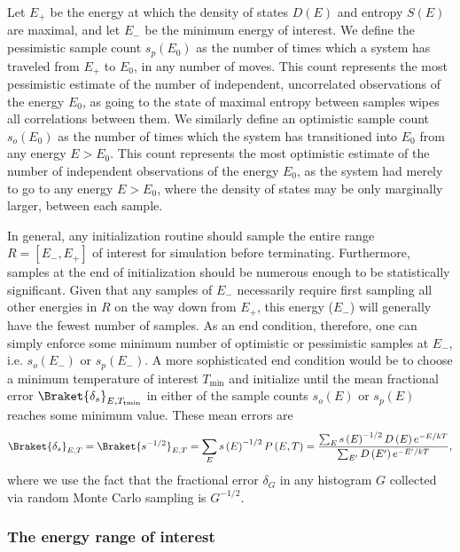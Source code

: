 \documentclass[11pt]{article}
\newcommand{\bk}{\Braket} %
\renewcommand{\t}{\text} %
\newcommand{\f}[2]{\dfrac{#1}{#2}} %
\newcommand{\p}[1]{\left(#1\right)} %
\renewcommand{\sp}[1]{\left[#1\right]} %
\begin{document}
Let $E_+$ be the energy at which the density of states $D\p{E}$ and
entropy $S\p{E}$ are maximal, and let $E_-$ be the minimum energy of
interest. We define the pessimistic sample count $s_p\p{E_0}$ as the
number of times which a system has traveled from $E_+$ to $E_0$, in
any number of moves. This count represents the most pessimistic
estimate of the number of independent, uncorrelated observations of
the energy $E_0$, as going to the state of maximal entropy between
samples wipes all correlations between them. We similarly define an
optimistic sample count $s_o\p{E_0}$ as the number of times which the
system has transitioned into $E_0$ from any energy $E>E_0$. This count
represents the most optimistic estimate of the number of independent
observations of the energy $E_0$, as the system had merely to go to
any energy $E>E_0$, where the density of states may be only marginally
larger, between each sample.

In general, any initialization routine should sample the entire range
$R=\sp{E_-,E_+}$ of interest for simulation before terminating.
Furthermore, samples at the end of initialization should be numerous
enough to be statistically significant. Given that any samples of
$E_-$ necessarily require first sampling all other energies in $R$ on
the way down from $E_+$, this energy ($E_-$) will generally have the
fewest number of samples. As an end condition, therefore, one can
simply enforce some minimum number of optimistic or pessimistic
samples at $E_-$, i.e. $s_o\p{E_-}$ or $s_p\p{E_-}$. A more
sophisticated end condition would be to choose a minimum temperature
of interest $T_{\t{min}}$ and initialize until the mean fractional
error $\bk{\delta_s}_{E,T_{\t{tmin}}}$ in either of the sample counts
$s_o\p{E}$ or $s_p\p{E}$ reaches some minimum value. These mean errors
are
\begin{align}
  \bk{\delta_s}_{E,T}=\bk{s^{-1/2}}_{E,T}=\sum_Es\p{E}^{-1/2}P\p{E,T}
  =\f{\sum_Es\p{E}^{-1/2}D\p{E}e^{-E/kT}}{\sum_{E'}D\p{E'}e^{-E'/kT}},
  \label{eq:fractional_sample_error}
\end{align}
where we use the fact that the fractional error $\delta_G$ in any
histogram $G$ collected via random Monte Carlo sampling is $G^{-1/2}$.

\subsubsection{The energy range of interest}
\label{sec:min_energy}
\end{document}
